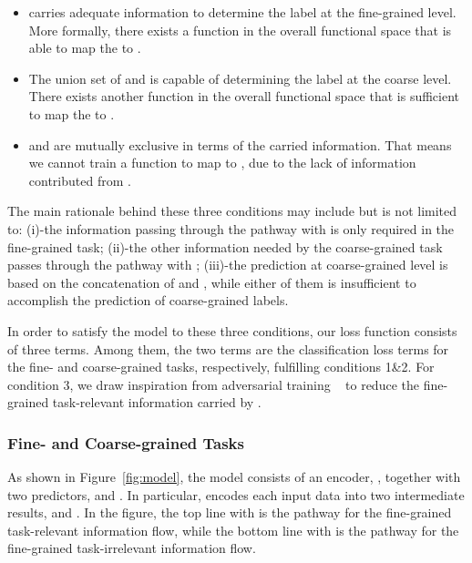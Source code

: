 \documentclass[11pt]{article}
\begin{document}
\begin{itemize}
    \item
     carries adequate information to determine the label at the fine-grained level. More formally, there exists a function  in the overall functional space that is able to map the  to .
\item The union set of  and  is capable of determining the label at the coarse level.
    There exists another function  in the overall functional space that is sufficient to map the  to .
\item  and  are mutually exclusive in terms of the carried information. That means we cannot train a function  to map  to , due to the lack of information contributed from .
\end{itemize}




The main rationale behind these three conditions may include but is not limited to: (i)-the information passing through the pathway with  is only required in the fine-grained task; (ii)-the other information needed by the coarse-grained task passes through the pathway with ; (iii)-the prediction at coarse-grained level is based on the concatenation of  and , while either of them is insufficient to accomplish the prediction of coarse-grained labels.



In order to satisfy the model to these three conditions, our loss function consists of three terms.
Among them, the two terms are the classification loss terms for the fine- and coarse-grained tasks, respectively, fulfilling conditions 1\&2.
For condition 3,  we draw inspiration from adversarial training ~\cite{lample2017fader} to reduce the fine-grained task-relevant information carried by . 



\subsubsection{Fine- and Coarse-grained Tasks}
As shown in Figure~\ref{fig:model}, the model consists of an encoder, , together with two predictors,   and . 
In particular,  encodes each input data  into two intermediate results,  and . 
In the figure, the top line with  is the pathway for the fine-grained task-relevant information flow,
while the bottom line with  is the pathway for the fine-grained task-irrelevant information flow.
\end{document}
